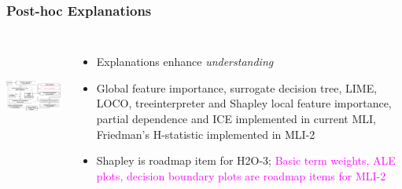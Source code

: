 \documentclass[11pt,
               aspectratio=169,
               hyperref={colorlinks}
               ]{beamer}
\begin{document}
		\begin{frame}
		
			\frametitle{Post-hoc Explanations}		
			
			\begin{columns}
	
				\centering
				\includegraphics[height=100pt]{img/exp.png}
				
				\vspace{-5pt}
				\begin{itemize}
					\item Explanations enhance \textit{understanding}
					\item Global feature importance, surrogate decision tree, LIME, LOCO, treeinterpreter and Shapley local feature importance, partial dependence and ICE implemented in current MLI, Friedman's H-statistic implemented in MLI-2
					\item Shapley is roadmap item for H2O-3; \textcolor{magenta}{Basic term weights, ALE plots, decision boundary plots are roadmap items for MLI-2}
				\end{itemize}
				
			\end{columns}
		
		\end{frame}
\end{document}
